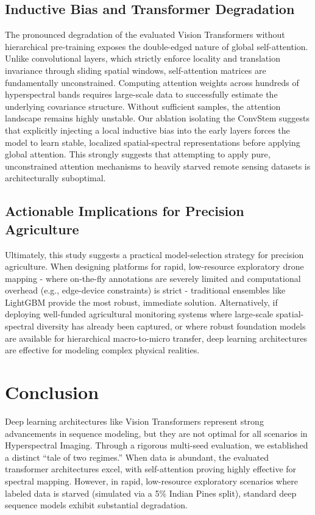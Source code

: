 \documentclass[pdflatex,sn-mathphys-num,iicol]{sn-jnl}
\begin{document}
\subsection{Inductive Bias and Transformer Degradation}
The pronounced degradation of the evaluated Vision Transformers without hierarchical pre-training exposes the double-edged nature of global self-attention. Unlike convolutional layers, which strictly enforce locality and translation invariance through sliding spatial windows, self-attention matrices are fundamentally unconstrained. Computing attention weights across hundreds of hyperspectral bands requires large-scale data to successfully estimate the underlying covariance structure. Without sufficient samples, the attention landscape remains highly unstable. Our ablation isolating the ConvStem suggests that explicitly injecting a local inductive bias into the early layers forces the model to learn stable, localized spatial-spectral representations before applying global attention. This strongly suggests that attempting to apply pure, unconstrained attention mechanisms to heavily starved remote sensing datasets is architecturally suboptimal.

\subsection{Actionable Implications for Precision Agriculture}
Ultimately, this study suggests a practical model-selection strategy for precision agriculture. When designing platforms for rapid, low-resource exploratory drone mapping - where on-the-fly annotations are severely limited and computational overhead (e.g., edge-device constraints) is strict - traditional ensembles like LightGBM provide the most robust, immediate solution. Alternatively, if deploying well-funded agricultural monitoring systems where large-scale spatial-spectral diversity has already been captured, or where robust foundation models are available for hierarchical macro-to-micro transfer, deep learning architectures are effective for modeling complex physical realities.

\section{Conclusion}\label{sec4}
Deep learning architectures like Vision Transformers represent strong advancements in sequence modeling, but they are not optimal for all scenarios in Hyperspectral Imaging. Through a rigorous multi-seed evaluation, we established a distinct ``tale of two regimes.'' When data is abundant, the evaluated transformer architectures excel, with self-attention proving highly effective for spectral mapping. However, in rapid, low-resource exploratory scenarios where labeled data is starved (simulated via a 5\% Indian Pines split), standard deep sequence models exhibit substantial degradation. 
\end{document}
